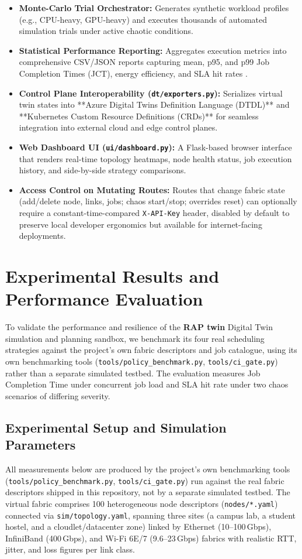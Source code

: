 \documentclass[twoside,twocolumn,10pt]{article}
\begin{document}
\begin{itemize}
    \item \textbf{Monte-Carlo Trial Orchestrator:} Generates synthetic workload profiles (e.g., CPU-heavy, GPU-heavy) and executes thousands of automated simulation trials under active chaotic conditions.
    \item \textbf{Statistical Performance Reporting:} Aggregates execution metrics into comprehensive CSV/JSON reports capturing mean, p95, and p99 Job Completion Times (JCT), energy efficiency, and SLA hit rates \cite{wang2022}.
    \item \textbf{Control Plane Interoperability (\texttt{dt/exporters.py}):} Serializes virtual twin states into **Azure Digital Twins Definition Language (DTDL)** and **Kubernetes Custom Resource Definitions (CRDs)** for seamless integration into external cloud and edge control planes.
    \item \textbf{Web Dashboard UI (\texttt{ui/dashboard.py}):} A Flask-based browser interface that renders real-time topology heatmaps, node health status, job execution history, and side-by-side strategy comparisons.
    \item \textbf{Access Control on Mutating Routes:} Routes that change fabric state (add/delete node, links, jobs; chaos start/stop; overrides reset) can optionally require a constant-time-compared \texttt{X-API-Key} header, disabled by default to preserve local developer ergonomics but available for internet-facing deployments.
\end{itemize}
    

\section{Experimental Results and Performance Evaluation}

To validate the performance and resilience of the \textbf{RAP twin} Digital Twin simulation and planning sandbox, we benchmark its four real scheduling strategies against the project's own fabric descriptors and job catalogue, using its own benchmarking tools (\texttt{tools/policy\_benchmark.py}, \texttt{tools/ci\_gate.py}) rather than a separate simulated testbed. The evaluation measures Job Completion Time under concurrent job load and SLA hit rate under two chaos scenarios of differing severity.

\subsection{Experimental Setup and Simulation Parameters}
All measurements below are produced by the project's own benchmarking tools (\texttt{tools/policy\_benchmark.py}, \texttt{tools/ci\_gate.py}) run against the real fabric descriptors shipped in this repository, not by a separate simulated testbed. The virtual fabric comprises 100 heterogeneous node descriptors (\texttt{nodes/*.yaml}) connected via \texttt{sim/topology.yaml}, spanning three sites (a campus lab, a student hostel, and a cloudlet/datacenter zone) linked by Ethernet (10--100\,Gbps), InfiniBand (400\,Gbps), and Wi-Fi 6E/7 (9.6--23\,Gbps) fabrics with realistic RTT, jitter, and loss figures per link class.
\end{document}
